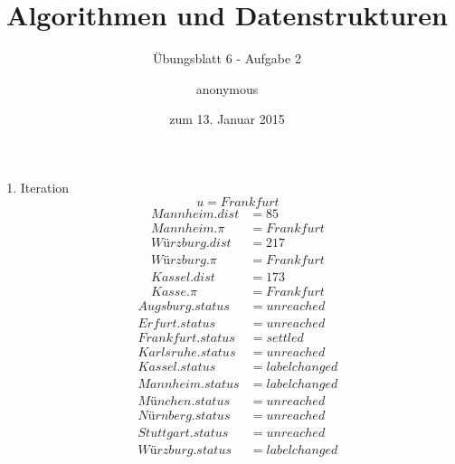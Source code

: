 \documentclass[a4paper]{scrartcl}
\title{Algorithmen und Datenstrukturen}
\subtitle{Übungsblatt 6 - Aufgabe 2}
\author{
    anonymous
}
\date{zum 13. Januar 2015}
\begin{document}
\maketitle

\begin{enumerate}
    \item Iteration
        \begin{equation*}
            u = Frankfurt
        \end{equation*}
        \begin{align*}
            Mannheim.dist &= 85 \\
            Mannheim.\pi &= Frankfurt \\
            Würzburg.dist &= 217 \\
            Würzburg.\pi &= Frankfurt \\
            Kassel.dist &= 173 \\
            Kasse.\pi &= Frankfurt
        \end{align*}
        \begin{align*}
            Augsburg.status &= unreached \\
            Erfurt.status &= unreached \\
            Frankfurt.status &= settled \\
            Karlsruhe.status &= unreached \\
            Kassel.status &= labelchanged \\
            Mannheim.status &= labelchanged \\
            München.status &= unreached \\
            Nürnberg.status &= unreached \\
            Stuttgart.status &= unreached \\
            Würzburg.status &= labelchanged \\
        \end{align*}
        

\end{enumerate}
\end{document}
